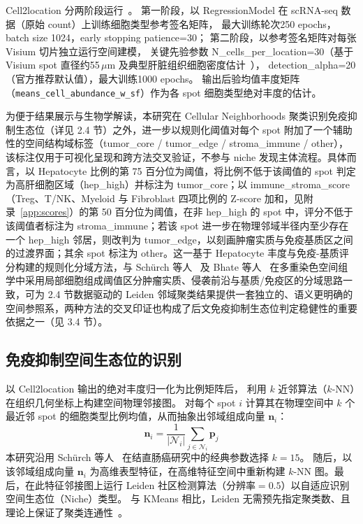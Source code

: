 \documentclass[12pt, a4paper]{ctexart}
\begin{document}
Cell2location 分两阶段运行~\citep{kleshchevnikov2022cell2location}。
第一阶段，以 RegressionModel 在 scRNA-seq 数据（原始 count）上训练细胞类型参考签名矩阵，
最大训练轮次250 epochs，batch size 1024，early stopping patience=30；
第二阶段，以参考签名矩阵对每张 Visium 切片独立运行空间建模，
关键先验参数 N\_cells\_per\_location=30（基于 Visium spot 直径约55\,$\mu$m 及典型肝脏组织细胞密度估计~\citep{kleshchevnikov2022cell2location}），
detection\_alpha=20（官方推荐默认值），最大训练1000 epochs。
输出后验均值丰度矩阵（\texttt{means\_cell\_abundance\_w\_sf}）作为各 spot 细胞类型绝对丰度的估计。

为便于结果展示与生物学解读，本研究在 Cellular Neighborhoods 聚类识别免疫抑制生态位（详见 2.4 节）之外，进一步以规则化阈值对每个 spot 附加了一个辅助性的空间结构域标签（tumor\_core / tumor\_edge / stroma\_immune / other），该标注仅用于可视化呈现和跨方法交叉验证，不参与 niche 发现主体流程。具体而言，以 Hepatocyte 比例的第 75 百分位为阈值，将比例不低于该阈值的 spot 判定为高肝细胞区域（hep\_high）并标注为 tumor\_core；以 immune\_stroma\_score（Treg、T/NK、Myeloid 与 Fibroblast 四项比例的 Z-score 加和，见附录~\ref{app:scores}）的第 50 百分位为阈值，在非 hep\_high 的 spot 中，评分不低于该阈值者标注为 stroma\_immune；若该 spot 进一步在物理邻域半径内至少存在一个 hep\_high 邻居，则改判为 tumor\_edge，以刻画肿瘤实质与免疫基质区之间的过渡界面；其余 spot 标注为 other。这一基于 Hepatocyte 丰度与免疫-基质评分构建的规则化分域方法，与 Schürch 等人~\citep{schurch2020coordinated} 及 Bhate 等人~\citep{bhate2022tissue} 在多重染色空间组学中采用局部细胞组成阈值区分肿瘤实质、侵袭前沿与基质/免疫区的分域思路一致，可为 2.4 节数据驱动的 Leiden 邻域聚类结果提供一套独立的、语义更明确的空间参照系，两种方法的交叉印证也构成了后文免疫抑制生态位判定稳健性的重要依据之一（见 3.4 节）。

\subsection{免疫抑制空间生态位的识别}

以 Cell2location 输出的绝对丰度归一化为比例矩阵后，
利用 $k$ 近邻算法（$k$-NN）在组织几何坐标上构建空间物理邻接图。
对每个 spot $i$ 计算其在物理空间中 $k$ 个最近邻 spot 的细胞类型比例均值，从而抽象出邻域组成向量 $\mathbf{n}_i$：
\begin{equation}
\mathbf{n}_i = \frac{1}{|\mathcal{N}_i|} \sum_{j \in \mathcal{N}_i} \mathbf{p}_j
\label{eq:neighborhood_vector}
\end{equation}
本研究沿用 Schürch 等人~\citep{schurch2020coordinated} 在结直肠癌研究中的经典参数选择 $k=15$。
随后，以该邻域组成向量 $\mathbf{n}_i$ 为高维表型特征，在高维特征空间中重新构建 $k$-NN 图。最后，在此特征邻接图上运行 Leiden 社区检测算法（分辨率$=0.5$）以自适应识别空间生态位（Niche）类型。
与 KMeans 相比，Leiden 无需预先指定聚类数、且理论上保证了聚类连通性~\citep{traag2019leiden}。
\end{document}
